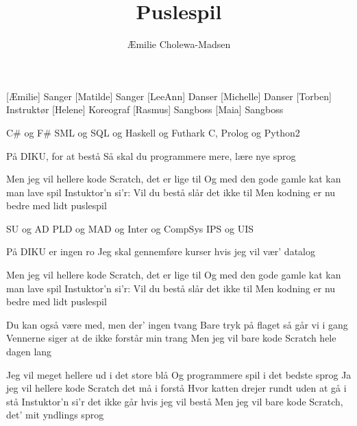 \documentclass[a4paper,11pt]{article}
\title{Puslespil}
\author{Æmilie Cholewa-Madsen}
\begin{document}
\maketitle

\begin{roles}
  [Æmilie] Sanger
  [Matilde] Sanger
  [LeeAnn] Danser
  [Michelle] Danser
  [Torben] Instruktør
  [Helene] Koreograf
  [Rasmus] Sangboss
  [Maia] Sangboss
\end{roles}

\begin{props}
\end{props}

\begin{song}
%
C\# og F\#
SML og SQL
og Haskell og Futhark
C, Prolog og Python2

På DIKU, for at bestå
Så skal du programmere mere,
lære nye sprog

Men jeg vil hellere kode Scratch, det er lige til
Og med den gode gamle kat kan man lave spil
Instuktor'n si'r: Vil du bestå slår det ikke til
Men kodning er nu bedre med lidt puslespil

SU og AD
PLD og MAD
og Inter og CompSys
IPS og UIS

På DIKU er ingen ro
Jeg skal gennemføre kurser
hvis jeg vil vær' datalog

Men jeg vil hellere kode Scratch, det er lige til
Og med den gode gamle kat kan man lave spil
Instuktor'n si'r: Vil du bestå slår det ikke til
Men kodning er nu bedre med lidt puslespil

Du kan også være med, men der' ingen tvang
Bare tryk på flaget så går vi i gang
Vennerne siger at de ikke forstår min trang
Men jeg vil bare kode Scratch hele dagen lang


%
Jeg vil meget hellere ud i det store blå
Og programmere spil i det bedste sprog
Ja jeg vil hellere kode Scratch det må i forstå
Hvor katten drejer rundt uden at gå i stå
Instuktor'n si'r det ikke går hvis jeg vil bestå
Men jeg vil bare kode Scratch, det' mit yndlings sprog


\end{song}
\end{document}
